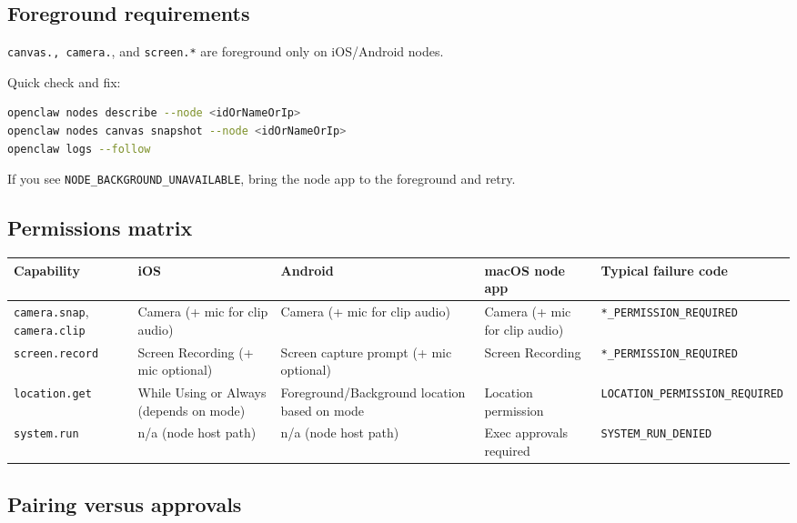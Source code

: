 \subsection{Foreground requirements}


\texttt{canvas.\textit{}, \texttt{camera.}}, and \texttt{screen.*} are foreground only on iOS/Android nodes.

Quick check and fix:

\begin{lstlisting}[language=bash]
openclaw nodes describe --node <idOrNameOrIp>
openclaw nodes canvas snapshot --node <idOrNameOrIp>
openclaw logs --follow
\end{lstlisting}


If you see \texttt{NODE\_BACKGROUND\_UNAVAILABLE}, bring the node app to the foreground and retry.

\subsection{Permissions matrix}



\begin{table}[h]
\centering
\small
\begin{tabular}{|l|l|l|l|l|}
\hline
Capability & iOS & Android & macOS node app & Typical failure code \\
\hline
\texttt{camera.snap}, \texttt{camera.clip} & Camera (+ mic for clip audio) & Camera (+ mic for clip audio) & Camera (+ mic for clip audio) & \texttt{*\_PERMISSION\_REQUIRED} \\
\hline
\texttt{screen.record} & Screen Recording (+ mic optional) & Screen capture prompt (+ mic optional) & Screen Recording & \texttt{*\_PERMISSION\_REQUIRED} \\
\hline
\texttt{location.get} & While Using or Always (depends on mode) & Foreground/Background location based on mode & Location permission & \texttt{LOCATION\_PERMISSION\_REQUIRED} \\
\hline
\texttt{system.run} & n/a (node host path) & n/a (node host path) & Exec approvals required & \texttt{SYSTEM\_RUN\_DENIED} \\
\hline
\end{tabular}
\end{table}



\subsection{Pairing versus approvals}


